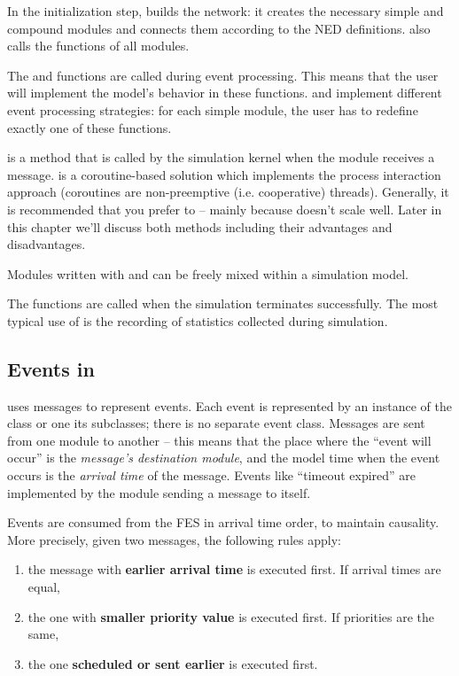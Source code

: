 In the initialization step, {\opp} builds the network: it creates the
necessary simple and compound modules and
connects them according to the NED definitions. {\opp} also calls the
 functions of all modules.

The  and  functions are
called during event processing. This means that the user will
implement the model's behavior in these functions.
 and  implement
different event processing strategies: for each simple module, the user
has to redefine exactly one of these functions.

 is a method that is called
by the simulation kernel when the module receives a message.
 is a coroutine-based solution
which implements the process interaction approach (coroutines are
non-preemptive (i.e. cooperative) threads). Generally, it is recommended
that you prefer  to  --
mainly because  doesn't scale well.
Later in this chapter we'll discuss both methods including their advantages
and disadvantages.

Modules written with  and 
can be freely mixed within a simulation model.

The  functions are called when the simulation
terminates successfully. The most typical use of 
is the recording of statistics collected during simulation.



\subsection{Events in {\opp}}

{\opp} uses messages to represent
events. Each event is represented by an instance of the
 class or one its subclasses; there is no separate
event class. Messages are sent from one module to another -- this
means that the place where the ``event will occur'' is the
\textit{message's destination module}, and the model time when the
event occurs is the \textit{arrival time} of the
message. Events like ``timeout expired'' are implemented by the
module sending a message to itself.

Events are consumed from the FES in arrival time order, to
maintain causality. More precisely, given two messages, the following
rules apply:
\begin{enumerate}
\item{the message with \textbf{earlier arrival time} is executed
    first.  If arrival times are equal,}
\item{the one with \textbf{smaller priority value} is executed first.
    If priorities are the same,}
\item{the one \textbf{scheduled or sent earlier} is executed first.}
\end{enumerate}

